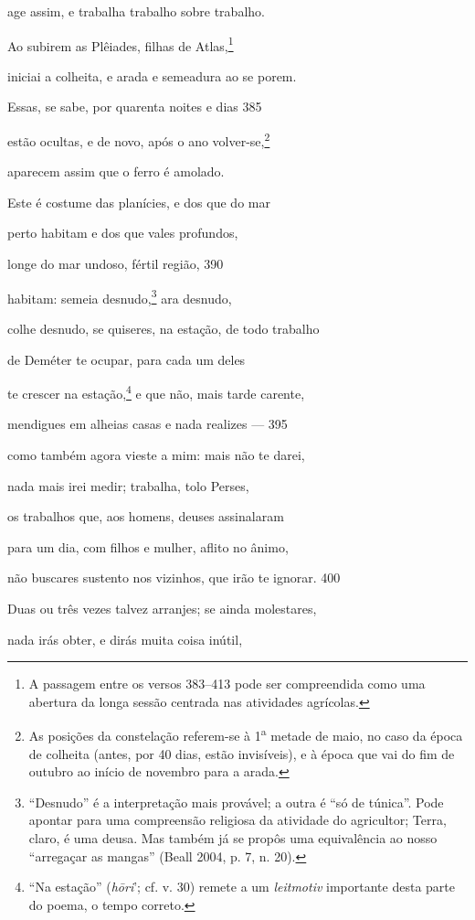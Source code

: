 age assim, e trabalha trabalho sobre trabalho.

Ao subirem as Plêiades, filhas de Atlas,\footnote{A passagem entre os versos 383--413  pode ser compreendida como uma abertura da longa
sessão centrada nas atividades agrícolas.}

iniciai a colheita, e arada e semeadura ao se porem.

Essas, se sabe, por quarenta noites e dias \num{385}

estão ocultas, e de novo, após o ano volver-se,\footnote{As posições da constelação referem-se à 1\textsuperscript{a}
metade de maio, no caso da época de colheita (antes, por 40 dias, estão
invisíveis), e à época que vai do fim de outubro ao início de novembro
para a arada.}

aparecem assim que o ferro é amolado.

Este é costume das planícies, e dos que do mar

perto habitam e dos que vales profundos,

longe do mar undoso, fértil região, \num{390}

habitam: semeia desnudo,\footnote{``Desnudo'' é a interpretação mais provável; a outra é ``só de túnica''. Pode apontar para uma compreensão religiosa da atividade do
agricultor; Terra, claro, é uma deusa. Mas também já se propôs uma
equivalência ao nosso ``arregaçar as mangas'' (Beall 2004, p. 7, n. 20).} ara desnudo,

colhe desnudo, se quiseres, na estação, de todo trabalho

de Deméter te ocupar, para cada um deles

te crescer na estação,\footnote{``Na estação'' (\emph{hōri}'; cf. v. 30) remete a um
\emph{leitmotiv} importante desta parte do poema, o tempo correto.} e que não, mais tarde carente,

mendigues em alheias casas e nada realizes --- \num{395}

como também agora vieste a mim: mais não te darei,

nada mais irei medir; trabalha, tolo Perses,

os trabalhos que, aos homens, deuses assinalaram

para um dia, com filhos e mulher, aflito no ânimo,

não buscares sustento nos vizinhos, que irão te ignorar. \num{400}

Duas ou três vezes talvez arranjes; se ainda molestares,

nada irás obter, e dirás muita coisa inútil,

